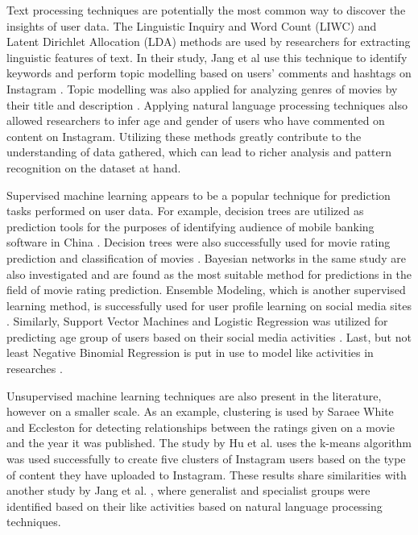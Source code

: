   Text processing techniques are potentially the most common way to discover the insights of user data. The Linguistic Inquiry and Word Count (LIWC) and Latent Dirichlet Allocation (LDA) methods are used by researchers \cite{ottoni2013ladies, farseev2015harvestingmultiplesources, jang2016teensengagemorewithfewerphotos} for extracting linguistic features of text. In their study, Jang et al use this technique to identify keywords and perform topic modelling based on users' comments and hashtags on Instagram \cite{jang2016teensengagemorewithfewerphotos}. Topic modelling was also applied for analyzing genres of movies by their title and description \cite{kabinsingha2012movie}. Applying natural language processing techniques also allowed researchers to infer age and gender of users \cite{han2016teensarefrommars} who have commented on content on Instagram. Utilizing these methods greatly contribute to the understanding of data gathered, which can lead to richer analysis and pattern recognition on the dataset at hand. 

  Supervised machine learning appears to be a popular technique for prediction tasks performed on user data. For example, decision trees are utilized as prediction tools for the purposes of identifying audience of mobile banking software in China \cite{chinesemobilebankingusers}. Decision trees were also successfully used for movie rating prediction \cite{saraee2004data} and classification of movies \cite{kabinsingha2012movie}. Bayesian networks in the same study \cite{kabinsingha2012movie} are also investigated and are found as the most suitable method for predictions in the field of movie rating prediction. Ensemble Modeling, which is another supervised learning method, is successfully used for user profile learning on social media sites \cite{farseev2015harvestingmultiplesources}. Similarly, Support Vector Machines and Logistic Regression was utilized for predicting age group of users based on their social media activities \cite{han2016teensarefrommars}. Last, but not least Negative Binomial Regression is put in use to model like activities in researches \cite{jang2015no, bakhshi2014faces}.

  Unsupervised machine learning techniques are also present in the literature, however on a smaller scale. As an example, clustering is used by Saraee White and Eccleston \cite{saraee2004data} for detecting relationships between the ratings given on a movie and the year it was published. The study by Hu et al. \cite{hu2014we} uses the k-means algorithm was used successfully to create five clusters of Instagram users based on the type of content they have uploaded to Instagram. These results share similarities with another study by Jang et al. \cite{jang2015no}, where generalist and specialist groups were identified based on their like activities based on natural language processing techniques. 

